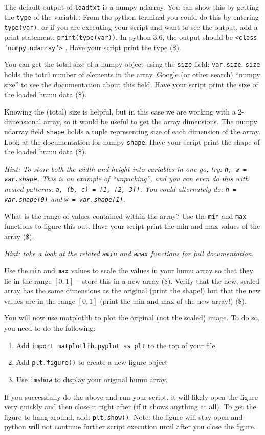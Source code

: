 \documentclass[10pt]{article}
\begin{document}
\begin{enumerate}
The default output of {\tt loadtxt} is a numpy ndarray.  You can show this by getting the {\tt type} of the variable.  From the python terminal you could do this by entering {\tt type(var)}, or if you are executing your script and want to see the output, add a print statement: {\tt print(type(var))}.  In python 3.6, the output should be {\tt <class 'numpy.ndarray'>} .  Have your script print the type (\$).

You can get the total size of a numpy object using the {\tt size} field: {\tt var.size}.  {\tt size} holds the total number of elements in the array.  Google (or other search) ``numpy size'' to see the documentation about this field.  Have your script print the size of the loaded humu data (\$).

Knowing the (total) size is helpful, but in this case we are working with a 2-dimensional array, so it would be useful to get the array dimensions.  The numpy ndarray field {\tt shape} holds a tuple representing size of each dimension of the array.  Look at the documentation for numpy {\tt shape}.  Have your script print the shape of the loaded humu data (\$).

{\em Hint: To store both the width and height into variables in one go, try: {\tt h, w = var.shape}.  This is an example of ``unpacking'', and you can even do this with nested patterns: {\tt a, (b, c) = [1, [2, 3]]}.  You could alternately do: {\tt h = var.shape[0]} and {\tt w = var.shape[1]}.}

What is the range of values contained within the array?  Use the {\tt min} and {\tt max} functions to figure this out.  Have your script print the min and max values of the array (\$).

{\em Hint: take a look at the related {\tt amin} and {\tt amax} functions for full documentation.}

Use the {\tt min} and {\tt max} values to scale the values in your humu array so that they lie in the range $[0, 1]$ -- store this in a new array (\$).  Verify that the new, scaled array has the same dimensions as the original (print the shape!) but that the new values are in the range $[0, 1]$ (print the min and max of the new array!) (\$).

You will now use matplotlib to plot the original (not the scaled) image.  To do so, you need to do the following:
\begin{enumerate}
\item Add {\tt import matplotlib.pyplot as plt} to the top of your file.
\item Add {\tt plt.figure()} to create a new figure object
\item Use {\tt imshow} to display your original humu array.
\end{enumerate}
If you successfully do the above and run your script, it will likely open the figure very quickly and then close it right after (if it shows anything at all).  To get the figure to hang around, add: {\tt plt.show()}.  Note: the figure will stay open and python will not continue further script execution until after you close the figure.


\end{enumerate}
\end{document}
